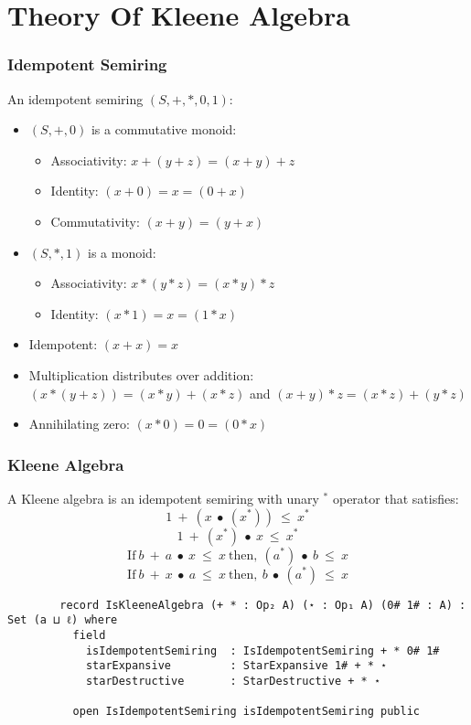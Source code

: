 \documentclass[xcolor={dvipsnames}]{beamer}
\begin{document}
\section{Theory Of Kleene Algebra}

\begin{frame}
  \frametitle{Idempotent Semiring}
  An idempotent semiring $(S,+,*,0,1)$:
  \begin{itemize}
    \item $(S,+,0)$ is a commutative monoid:
    \begin{itemize}
      \item Associativity: $ x + (y + z) = (x + y) + z$
      \item Identity: $ (x + 0) = x = (0 + x)$
      \item Commutativity: $ (x + y) = (y + x)$
    \end{itemize}
    \item $(S,*,1)$ is a monoid:
    \begin{itemize}
      \item Associativity: $ x * (y*z)  = (x*y)*z$
      \item Identity: $ (x * 1) = x = (1 * x)$
    \end{itemize}
    \item Idempotent: $ (x + x) = x$
    \item Multiplication distributes over addition: \( (x * (y + z)) = (x * y) + (x
    * z)\) and \( (x + y) * z = (x * z) + (y * z) \)
    \item Annihilating zero: \( (x * 0) = 0 = (0 * x)\)
    \end{itemize}

\end{frame}


\begin{frame}[fragile]
  \frametitle{Kleene Algebra}

    A Kleene algebra is an idempotent semiring with unary $^{*}$ operator that satisfies:
        \[ 1\ +\ (x\ ∙\ (x^{*}))\ \leq\ x^{*}\]
        \[ 1\ +\ (x^{*})\ ∙\ x\ \leq\ x^{*}\]
        \[\text{If} \ b\ +\ a\  ∙\ x\ \leq\ x\ \text{then},\ (a^{*})\ ∙\ b\ \leq\ x\]
        \[\text{If} \ b\ +\ x\ ∙\ a\ \leq\ x \  \text{then},\ b\ ∙\ (a^{*})\ \leq\ x\]

    \begin{verbatim}
        record IsKleeneAlgebra (+ * : Op₂ A) (⋆ : Op₁ A) (0# 1# : A) : Set (a ⊔ ℓ) where
          field
            isIdempotentSemiring  : IsIdempotentSemiring + * 0# 1#
            starExpansive         : StarExpansive 1# + * ⋆
            starDestructive       : StarDestructive + * ⋆
    
          open IsIdempotentSemiring isIdempotentSemiring public
    \end{verbatim}
\end{frame}
\end{document}
